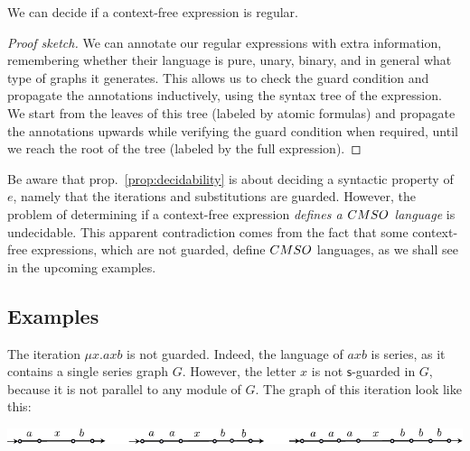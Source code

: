 \begin{proposition}\label{prop:decidability}
We can decide if a  context-free expression is regular.
\end{proposition}
\begin{proof}[Proof sketch]We can annotate our regular expressions with extra information, remembering whether their language is pure, unary, binary, and in
general what type of graphs it generates. This allows us to check the
guard condition and propagate the annotations inductively, using the
syntax tree of the expression.  We start from the leaves of this tree
(labeled by atomic formulas) and propagate the annotations upwards while
verifying the guard condition when required, until we reach the root of
the tree (labeled by the full expression).
\end{proof}
\begin{remark}
Be aware that prop.~\ref{prop:decidability} is about deciding a syntactic property of $e$, namely that the iterations and substitutions are guarded. However, the problem of determining if a context-free expression \emph{defines a $\CMSO$ language} is undecidable. This apparent contradiction comes from the fact that  some context-free expressions, which are not guarded, define $\CMSO$ languages, as we shall see in the upcoming examples.
\end{remark}



\subsection{Examples}



 


\begin{example} The iteration $\mu x. axb$ is not guarded. Indeed, the language of $axb$ is series, as it contains a single series graph $G$. However, the letter $x$ is not $\mathsf{s}$-guarded in $G$, because it is not parallel to any module of $G$. The graph of this iteration look like this:
\begin{center}
\includegraphics[scale=1]{Pictures/expl0.pdf}
\end{center}
\end{example}
 
